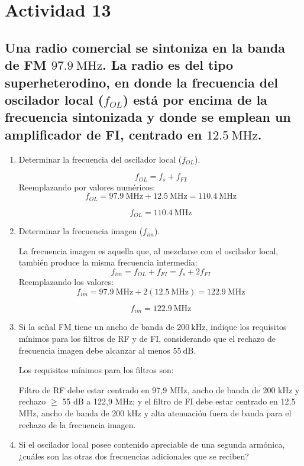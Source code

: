 \section{Actividad 13}

\subsection*{Una radio comercial se sintoniza en la banda de FM $97.9\ \mathrm{MHz}$. 
La radio es del tipo superheterodino, en donde la frecuencia del oscilador local ($f_{OL}$) 
está por encima de la frecuencia sintonizada y donde se emplean un amplificador de FI, 
centrado en $12.5\ \mathrm{MHz}$.}

\begin{enumerate}
  \item Determinar la frecuencia del oscilador local ($f_{OL}$).

      \[
        f_{OL} = f_s + f_{FI}
        \]
        Reemplazando por valores numéricos:
        \[
        f_{OL} = 97.9~\text{MHz} + 12.5~\text{MHz} = 110.4~\text{MHz}
        \]
        
        \[
        \boxed{f_{OL} = 110.4~\text{MHz}}
        \]
  
  \item Determinar la frecuencia imagen ($f_{im}$).

  La frecuencia imagen es aquella que, al mezclarse con el oscilador local, también produce la misma frecuencia intermedia:
        \[
        f_{im} = f_{OL} + f_{FI} = f_s + 2f_{FI}
        \]
        Reemplazando los valores:
        \[
        f_{im} = 97.9~\text{MHz} + 2(12.5~\text{MHz}) = 122.9~\text{MHz}
        \]
        
        \[
        \boxed{f_{im} = 122.9~\text{MHz}}
        \]
  
  \item Si la señal FM tiene un ancho de banda de $200\ \mathrm{kHz}$, indique los requisitos 
  mínimos para los filtros de RF y de FI, considerando que el rechazo de frecuencia imagen 
  debe alcanzar al menos $55\ \mathrm{dB}$.

    Los requisitos mínimos para los filtros son:
    
    Filtro de RF debe estar centrado en 97,9 MHz, ancho de banda de 200 kHz y rechazo $\geq$ 55 dB a 122,9 MHz; y el filtro de FI debe estar centrado en 12,5 MHz, ancho de banda de 200 kHz y alta atenuación fuera de banda para el rechazo de la frecuencia imagen.

  
  \item Si el oscilador local posee contenido apreciable de una segunda armónica, ¿cuáles son 
  las otras dos frecuencias adicionales que se reciben?


\end{enumerate}
